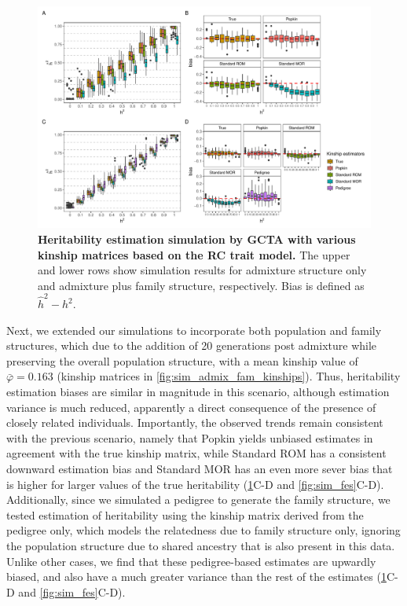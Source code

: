 \documentclass[11pt]{article}
\begin{document}
\begin{figure}[bp!]
  \centering
  \includegraphics[width=\textwidth]{data/Fig_sim_rc.pdf}
  \caption{
    {\bf Heritability estimation simulation by GCTA with various kinship matrices based on the RC trait model.}
    The upper and lower rows show simulation results for admixture structure only and admixture plus family structure, respectively.
    Bias is defined as $\hat{h}^2 - h^2$.
    }
  \label{fig:Herit_sim}
\end{figure}

Next, we extended our simulations to incorporate both population and family structures, which due to the addition of 20 generations post admixture while preserving the overall population structure, with a mean kinship value of $\bar{\varphi} = 0.163$ (kinship matrices in \cref{fig:sim_admix_fam_kinships}).  Thus, heritability estimation biases are similar in magnitude in this scenario, although estimation variance is much reduced, apparently a direct consequence of the presence of closely related individuals.  Importantly, the observed trends remain consistent with the previous scenario, namely that Popkin yields unbiased estimates in agreement with the true kinship matrix, while Standard ROM has a consistent downward estimation bias and Standard MOR has an even more sever bias that is higher for larger values of the true heritability (\cref{fig:Herit_sim}C-D and \cref{fig:sim_fes}C-D).  Additionally, since we simulated a pedigree to generate the family structure, we tested estimation of heritability using the kinship matrix derived from the pedigree only, which models the relatedness due to family structure only, ignoring the population structure due to shared ancestry that is also present in this data.  Unlike other cases, we find that these pedigree-based estimates are upwardly biased, and also have a much greater variance than the rest of the estimates (\cref{fig:Herit_sim}C-D and \cref{fig:sim_fes}C-D).
\end{document}
